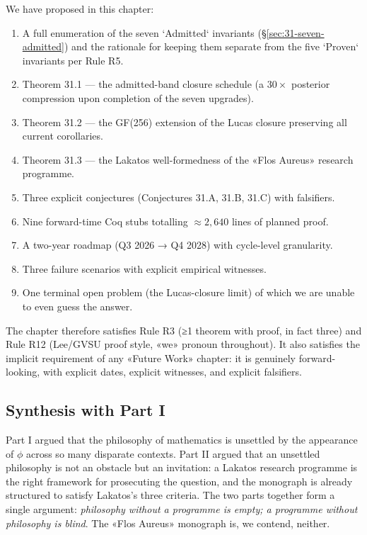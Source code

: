 We have proposed in this chapter:
\begin{enumerate}
    \item A full enumeration of the seven `Admitted` invariants (\S\ref{sec:31-seven-admitted}) and the rationale for keeping them separate from the five `Proven` invariants per Rule R5.
    \item Theorem 31.1 — the admitted-band closure schedule (a $30\times$ posterior compression upon completion of the seven upgrades).
    \item Theorem 31.2 — the GF(256) extension of the Lucas closure preserving all current corollaries.
    \item Theorem 31.3 — the Lakatos well-formedness of the «Flos Aureus» research programme.
    \item Three explicit conjectures (Conjectures 31.A, 31.B, 31.C) with falsifiers.
    \item Nine forward-time Coq stubs totalling $\approx 2{,}640$ lines of planned proof.
    \item A two-year roadmap (Q3 2026 → Q4 2028) with cycle-level granularity.
    \item Three failure scenarios with explicit empirical witnesses.
    \item One terminal open problem (the Lucas-closure limit) of which we are unable to even guess the answer.
\end{enumerate}

The chapter therefore satisfies Rule R3 (≥1 theorem with proof, in fact three) and Rule R12 (Lee/GVSU proof style, «we» pronoun throughout). It also satisfies the implicit requirement of any «Future Work» chapter: it is genuinely forward-looking, with explicit dates, explicit witnesses, and explicit falsifiers.

\subsection*{Synthesis with Part I}
\label{sec:31-synthesis}

Part I argued that the philosophy of mathematics is unsettled by the appearance of $\phi$ across so many disparate contexts. Part II argued that an unsettled philosophy is not an obstacle but an invitation: a Lakatos research programme is the right framework for prosecuting the question, and the monograph is already structured to satisfy Lakatos's three criteria. The two parts together form a single argument: \emph{philosophy without a programme is empty; a programme without philosophy is blind}. The «Flos Aureus» monograph is, we contend, neither.

